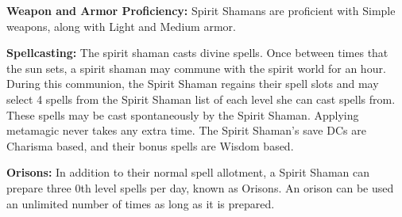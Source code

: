 \begin{fullcastingclasstable}
\end{fullcastingclasstable}

\classfeatures

\textbf{Weapon and Armor Proficiency:} Spirit Shamans are proficient with Simple weapons, along with Light and Medium armor.

\textbf{Spellcasting:} The spirit shaman casts divine spells. Once between times that the sun sets, a spirit shaman may commune with the spirit world for an hour. During this communion, the Spirit Shaman regains their spell slots and may select 4 spells from the Spirit Shaman list of each level she can cast spells from. These spells may be cast spontaneously by the Spirit Shaman. Applying metamagic never takes any extra time. The Spirit Shaman's save DCs are Charisma based, and their bonus spells are Wisdom based.

\textbf{Orisons:} In addition to their normal spell allotment, a Spirit Shaman can prepare three 0th level spells per day, known as Orisons. An orison can be used an unlimited number of times as long as it is prepared.

